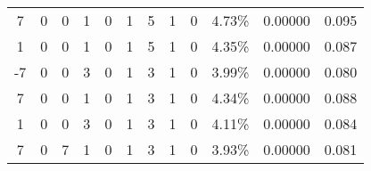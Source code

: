 \documentclass[aspectratio=169]{beamer}
\begin{document}
\begin{frame}
\begin{center}
\begin{tabular}{ccccccccc|ccc}
			7 &                                     0 &                                   0 &                                                1 &                                                0 &                                            1 &                           5 &                           1 &                            0 &                              4.73\% &                        0.00000 &                      0.095 \\
			1 &                                     0 &                                   0 &                                                1 &                                                0 &                                            1 &                           5 &                           1 &                            0 &                              4.35\% &                        0.00000 &                      0.087 \\
			-7 &                                     0 &                                   0 &                                                3 &                                                0 &                                            1 &                           3 &                           1 &                            0 &                              3.99\% &                        0.00000 &                      0.080 \\
			7 &                                     0 &                                   0 &                                                1 &                                                0 &                                            1 &                           3 &                           1 &                            0 &                              4.34\% &                        0.00000 &                      0.088 \\
			1 &                                     0 &                                   0 &                                                3 &                                                0 &                                            1 &                           3 &                           1 &                            0 &                              4.11\% &                        0.00000 &                      0.084 \\
			7 &                                     0 &                                   7 &                                                1 &                                                0 &                                            1 &                           3 &                           1 &                            0 &                              3.93\% &                        0.00000 &                      0.081 \\
		\end{tabular}

		\end{center}
	\end{frame}
\end{document}
